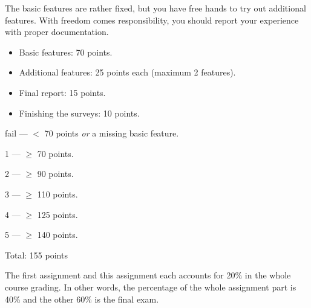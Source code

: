 \documentclass[12pt, a4paper]{article}
\begin{document}
The basic features are rather fixed, but you have free hands to try out additional features.
With freedom comes responsibility, you should report your experience with proper documentation.

\begin{itemize}
\item Basic features: 70 points.
\item Additional features: 25 points each (maximum 2 features).
\item Final report: 15 points.
\item Finishing the surveys: 10 points.
\end{itemize}

fail --- $<$ 70 points \emph{or} a missing basic feature.

1 --- $\ge$ 70 points.

2 --- $\ge$ 90 points.

3 --- $\ge$ 110 points.

4 --- $\ge$ 125 points.

5 --- $\ge$ 140 points.

\vskip 20pt

Total: 155 points

\vskip 20pt

The first assignment and this assignment each accounts for 20\% in the whole course grading.
In other words, the percentage of the whole assignment part is 40\% and the other 60\% is the final exam.
\end{document}
